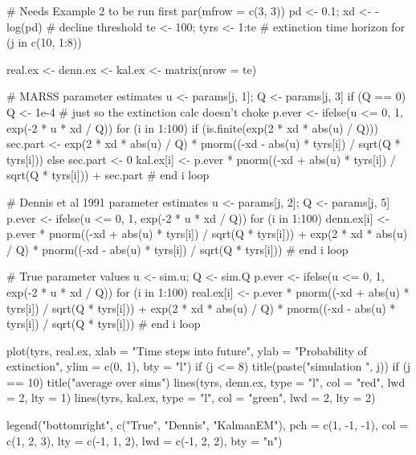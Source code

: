 \begin{Schunk}
\begin{Sinput}
 # Needs Example 2 to be run first
 par(mfrow = c(3, 3))
 pd <- 0.1; xd <- -log(pd) # decline threshold
 te <- 100; tyrs <- 1:te # extinction time horizon
 for (j in c(10, 1:8)) {
   real.ex <- denn.ex <- kal.ex <- matrix(nrow = te)
 
   # MARSS parameter estimates
   u <- params[j, 1]; Q <- params[j, 3]
   if (Q == 0) Q <- 1e-4 # just so the extinction calc doesn't choke
   p.ever <- ifelse(u <= 0, 1, exp(-2 * u * xd / Q))
   for (i in 1:100) {
     if (is.finite(exp(2 * xd * abs(u) / Q))) {
       sec.part <- exp(2 * xd * abs(u) / Q) * 
         pnorm((-xd - abs(u) * tyrs[i]) / sqrt(Q * tyrs[i]))
     } else { sec.part <- 0 }
     kal.ex[i] <- p.ever * pnorm((-xd + abs(u) * tyrs[i]) / sqrt(Q * tyrs[i])) + sec.part
   } # end i loop
 
   # Dennis et al 1991 parameter estimates
   u <- params[j, 2]; Q <- params[j, 5]
   p.ever <- ifelse(u <= 0, 1, exp(-2 * u * xd / Q))
   for (i in 1:100) {
     denn.ex[i] <- p.ever * pnorm((-xd + abs(u) * tyrs[i]) / sqrt(Q * tyrs[i])) +
       exp(2 * xd * abs(u) / Q) * 
       pnorm((-xd - abs(u) * tyrs[i]) / sqrt(Q * tyrs[i]))
   } # end i loop
 
   # True parameter values
   u <- sim.u; Q <- sim.Q
   p.ever <- ifelse(u <= 0, 1, exp(-2 * u * xd / Q))
   for (i in 1:100) {
     real.ex[i] <- p.ever * pnorm((-xd + abs(u) * tyrs[i]) / sqrt(Q * tyrs[i])) +
       exp(2 * xd * abs(u) / Q) * 
       pnorm((-xd - abs(u) * tyrs[i]) / sqrt(Q * tyrs[i]))
   } # end i loop
 
   plot(tyrs, real.ex, xlab = "Time steps into future",
     ylab = "Probability of extinction", ylim = c(0, 1), bty = "l")
   if (j <= 8) title(paste("simulation ", j))
   if (j == 10) title("average over sims")
   lines(tyrs, denn.ex, type = "l", col = "red", lwd = 2, lty = 1)
   lines(tyrs, kal.ex, type = "l", col = "green", lwd = 2, lty = 2)
 }
 legend("bottomright", c("True", "Dennis", "KalmanEM"), pch = c(1, -1, -1),
   col = c(1, 2, 3), lty = c(-1, 1, 2), lwd = c(-1, 2, 2), bty = "n")
\end{Sinput}
\end{Schunk}
